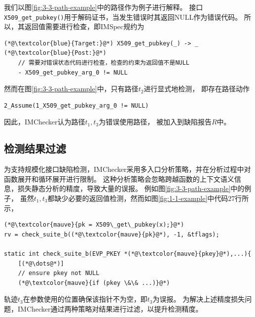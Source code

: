 我们以图\ref{fig:3-3-path-example}中的路径作为例子进行解释。
接口\texttt{X509\_get\_pubkey()}用于解码证书，当发生错误时其返回NULL作为错误代码。
所以，其返回值需要进行检查，即IMSpec规约为
\begin{lstlisting}[language={[ANSI]C},
basicstyle=\linespread{0.8}\listingsfont,
numbers=none,
xleftmargin=.15\textwidth]
(*@\textcolor{blue}{Target:}@*) X509_get_pubkey(_) -> _
(*@\textcolor{blue}{Post:}@*) 
	// 需要对错误状态代码进行检查，检查的约束为返回值不是NULL
	- X509_get_pubkey_arg_0 != NULL
\end{lstlisting}
然而在图\ref{fig:3-3-path-example}中，只有路径$t_2$进行显式地检测，
即存在路径动作
\begin{lstlisting}[language={[ANSI]C},
basicstyle=\linespread{0.8}\listingsfont,
numbers=none,
xleftmargin=.15\textwidth]
2_Assume(1_X509_get_pubkey_arg_0 != NULL)
\end{lstlisting}
因此，IMChecker认为路径$t_1, t_3$为错误使用路径，
被加入到缺陷报告$R$中。

\subsection{检测结果过滤}
为支持规模化接口缺陷检测，IMChecker采用多入口分析策略，并在分析过程中对函数展开和循环展开进行限制。
这种分析策略会忽略跨越函数的上下文语义信息，损失静态分析的精度，导致大量的误报。
例如图\ref{fig:3-3-path-example}中的例子，
虽然$t_1, t_3$都缺少必要的返回值检测，然而如图\ref{fig:1-1-example}中代码27行所示，
\begin{lstlisting}[language={[ANSI]C},
basicstyle=\linespread{0.7}\listingsfont,
numbers=none,
xleftmargin=.15\textwidth]
(*@\textcolor{mauve}{pk = X509\_get\_pubkey(x);}@*)
rv = check_suite_b((*@\textcolor{mauve}{pk}@*), -1, &tflags);
	
static int check_suite_b(EVP_PKEY *(*@\textcolor{mauve}{pkey}@*),...){
	[(*@\dots@*)]
	// ensure pkey not NULL
	(*@\textcolor{mauve}{if (pkey \&\& ...)}@*)
\end{lstlisting}
轨迹$t_3$在参数使用的位置确保该指针不为空，即$t_3$为误报。
为解决上述精度损失问题，IMChecker通过两种策略对结果进行过滤，以提升检测精度。

